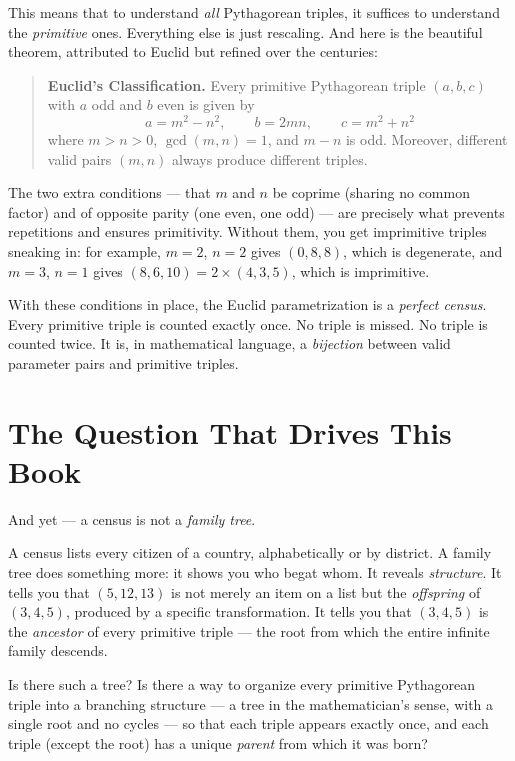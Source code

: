This means that to understand \emph{all} Pythagorean triples, it suffices to understand the \emph{primitive} ones. Everything else is just rescaling. And here is the beautiful theorem, attributed to Euclid but refined over the centuries:

\begin{quote}
\textbf{Euclid's Classification.} Every primitive Pythagorean triple \((a, b, c)\) with \(a\) odd and \(b\) even is given by \[a = m^2 - n^2, \qquad b = 2mn, \qquad c = m^2 + n^2\] where \(m > n > 0\), \(\gcd(m, n) = 1\), and \(m - n\) is odd. Moreover, different valid pairs \((m, n)\) always produce different triples.
\end{quote}

The two extra conditions --- that \(m\) and \(n\) be coprime (sharing no common factor) and of opposite parity (one even, one odd) --- are precisely what prevents repetitions and ensures primitivity. Without them, you get imprimitive triples sneaking in: for example, \(m = 2\), \(n = 2\) gives \((0, 8, 8)\), which is degenerate, and \(m = 3\), \(n = 1\) gives \((8, 6, 10) = 2 \times (4, 3, 5)\), which is imprimitive.

With these conditions in place, the Euclid parametrization is a \emph{perfect census}. Every primitive triple is counted exactly once. No triple is missed. No triple is counted twice. It is, in mathematical language, a \emph{bijection} between valid parameter pairs and primitive triples.



\section{The Question That Drives This Book}\label{intro-the-question-that-drives-this-book}

And yet --- a census is not a \emph{family tree}.

A census lists every citizen of a country, alphabetically or by district. A family tree does something more: it shows you who begat whom. It reveals \emph{structure}. It tells you that \((5, 12, 13)\) is not merely an item on a list but the \emph{offspring} of \((3, 4, 5)\), produced by a specific transformation. It tells you that \((3, 4, 5)\) is the \emph{ancestor} of every primitive triple --- the root from which the entire infinite family descends.

Is there such a tree? Is there a way to organize every primitive Pythagorean triple into a branching structure --- a tree in the mathematician's sense, with a single root and no cycles --- so that each triple appears exactly once, and each triple (except the root) has a unique \emph{parent} from which it was born?

